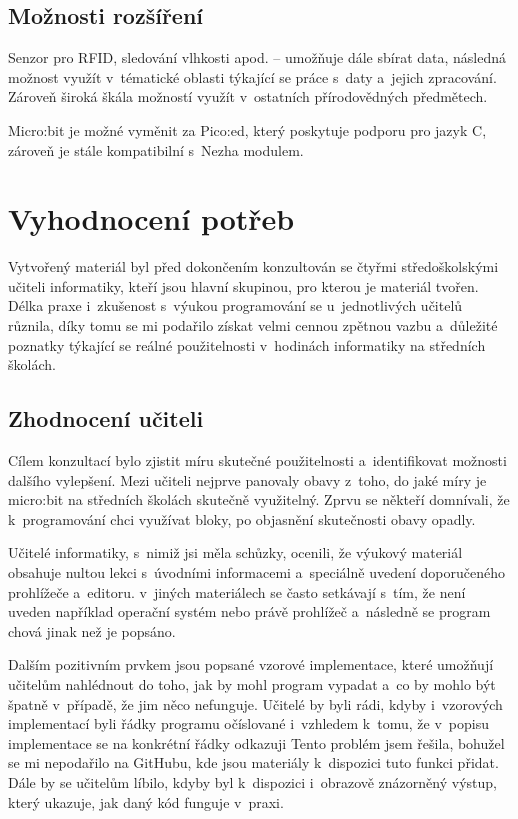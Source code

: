 \documentclass[
  digital,     %
  oneside,     %
  nosansbold,  %
  colorbold, %
  lof,         %
  nolot,         %
]{fithesis4}
\begin{document}
\section{Možnosti rozšíření}
Senzor pro RFID, sledování vlhkosti apod. -- umožňuje dále sbírat data, následná možnost využít v~tématické oblasti týkající se práce s~daty a~jejich zpracování. Zároveň široká škála možností využít v~ostatních přírodovědných předmětech.

Micro:bit je možné vyměnit za Pico:ed, který poskytuje podporu pro jazyk C, zároveň je stále kompatibilní s~Nezha modulem. 

\chapter{Vyhodnocení potřeb}
Vytvořený materiál byl před dokončením konzultován se čtyřmi středoškolskými učiteli informatiky, kteří jsou hlavní skupinou, pro kterou je materiál tvořen. Délka praxe i~zkušenost s~výukou programování se u~jednotlivých učitelů různila, díky tomu se mi podařilo získat velmi cennou zpětnou vazbu a~důležité poznatky týkající se reálné použitelnosti v~hodinách informatiky na středních školách.

\section{Zhodnocení učiteli}
Cílem konzultací bylo zjistit míru skutečné použitelnosti a~identifikovat možnosti dalšího vylepšení. Mezi učiteli nejprve panovaly obavy z~toho, do jaké míry je micro:bit na středních školách skutečně využitelný. Zprvu se někteří domnívali, že k~programování chci využívat bloky, po objasnění skutečnosti obavy opadly.

Učitelé informatiky, s~nimiž jsi měla schůzky, ocenili, že výukový materiál obsahuje nultou lekci s~úvodními informacemi a~speciálně uvedení doporučeného prohlížeče a~editoru. v~jiných materiálech se často setkávají s~tím, že není uveden například operační systém nebo právě prohlížeč a~následně se program chová jinak než je popsáno. 

Dalším pozitivním prvkem jsou popsané vzorové implementace, které umožňují učitelům nahlédnout do toho, jak by mohl program vypadat a~co by mohlo být špatně v~případě, že jim něco nefunguje. Učitelé by byli rádi, kdyby i~vzorových implementací byli řádky programu očíslované i~vzhledem k~tomu, že v~popisu implementace se na konkrétní řádky odkazuji Tento problém jsem řešila, bohužel se mi nepodařilo na GitHubu, kde jsou materiály k~dispozici tuto funkci přidat. Dále by se učitelům líbilo, kdyby byl k~dispozici i~obrazově znázorněný výstup, který ukazuje, jak daný kód funguje v~praxi.
\end{document}
